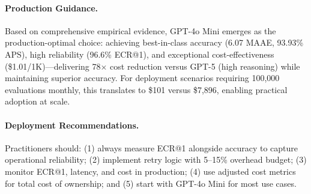 \documentclass[letterpaper]{article} %
\begin{document}
\paragraph{Production Guidance.} Based on comprehensive empirical evidence, GPT-4o Mini emerges as the production-optimal choice: achieving best-in-class accuracy (6.07 MAAE, 93.93\% APS), high reliability (96.6\% ECR@1), and exceptional cost-effectiveness (\$1.01/1K)---delivering 78$\times$ cost reduction versus GPT-5 (high reasoning) while maintaining superior accuracy. For deployment scenarios requiring 100,000 evaluations monthly, this translates to \$101 versus \$7,896, enabling practical adoption at scale. 

\paragraph{Deployment Recommendations.} Practitioners should: (1) always measure ECR@1 alongside accuracy to capture operational reliability; (2) implement retry logic with 5--15\% overhead budget; (3) monitor ECR@1, latency, and cost in production; (4) use adjusted cost metrics for total cost of ownership; %
and (5) start with GPT-4o Mini for most use cases. %

\end{document}
